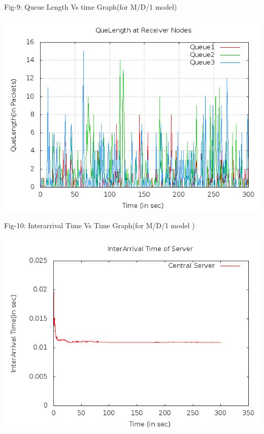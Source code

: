 \documentclass[a4paper,12pt]{report}
\begin{document}
\noindent Fig-9: Queue Length Vs time Graph(for M/D/1 model)
\begin{center}
 \includegraphics[width=12 cm,height=12 cm]{../problem2/queuelength.png}
\end{center}
\noindent Fig-10: Interarrival Time Vs Time Graph(for M/D/1 model )\\
\begin{center}
 \includegraphics[width=12 cm,height=12 cm]{../problem2/interarrival.png}
\end{center}
\end{document}
